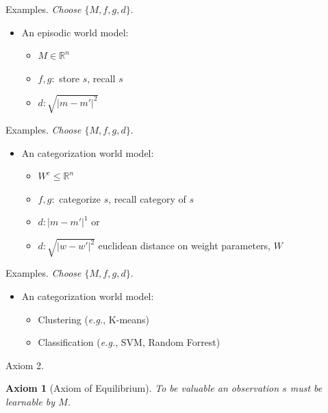 \documentclass[10pt]{beamer}
\newtheorem{axiom}{Axiom}
\begin{document}
\begin{frame}[fragile]{Examples.}
\textit{Choose $\{M, f, g, d\}$}.
\begin{itemize}
    \item An episodic world model:
    \begin{itemize}
        \item $M \in \mathbb{R}^n$
        \item $f,g: $ store $s$, recall $s$
        \item $d: \sqrt{|m - m'|^2}$ 
    \end{itemize}
\end{itemize}
\end{frame}

\begin{frame}[fragile]{Examples.}
\textit{Choose $\{M, f, g, d\}$}.
\begin{itemize}
    \item An categorization world model:
    \begin{itemize}
        \item $W^c \leq \mathbb{R}^n$
        \item $f,g: $ categorize $s$, recall category of $s$
        \item $d: |m - m'|^1$ or 
        \item $d: \sqrt{|w - w'|^2}$ euclidean distance on weight parameters, $W$
    \end{itemize}
\end{itemize}
\end{frame}

\begin{frame}[fragile]{Examples.}
\textit{Choose $\{M, f, g, d\}$}.
\begin{itemize}
    \item An categorization world model:
    \begin{itemize}
        \item Clustering (\textit{e.g.}, K-means)
        \item Classification (\textit{e.g.}, SVM, Random Forrest)
    \end{itemize}
\end{itemize}
\end{frame}

\begin{frame}[fragile]{Axiom 2.}
\begin{axiom}
	[Axiom of Equilibrium] To be valuable an observation $s$ must be learnable by $M$. 
\label{ax:5} 
\end{axiom}
\end{frame}
\end{document}
